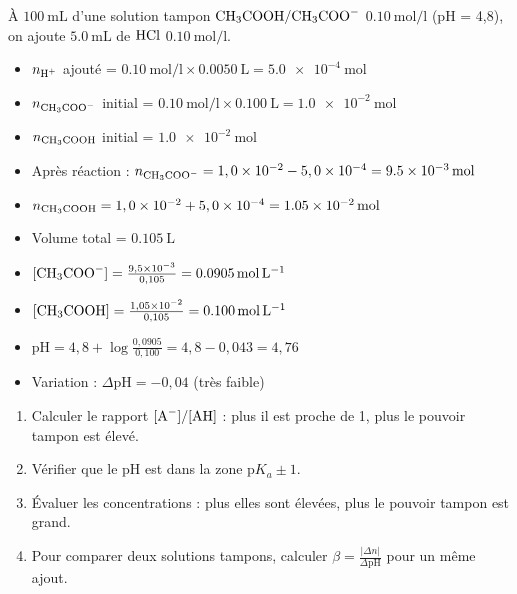 \begin{exemple}
À $\SI{100}{\mL}$ d'une solution tampon $\ce{CH3COOH/CH3COO-}$ $\SI{0,10}{\mol\per\litre}$ (pH = 4,8), on ajoute $\SI{5,0}{\mL}$ de $\ce{HCl}$ $\SI{0,10}{\mol\per\litre}$.
\begin{itemize}
    \item $n_{\ce{H+}}$ ajouté = $\SI{0,10}{\mol\per\litre} \times \SI{0,0050}{\L} = \SI{5,0e-4}{\mol}$
    \item $n_{\ce{CH3COO-}}$ initial = $\SI{0,10}{\mol\per\litre} \times \SI{0,100}{\L} = \SI{1,0e-2}{\mol}$
    \item $n_{\ce{CH3COOH}}$ initial = $\SI{1,0e-2}{\mol}$
    \item Après réaction : $n_{\ce{CH3COO-}} = 1,0\times10^{-2} - 5,0\times10^{-4} = \SI{9,5e-3}{\mol}$
    \item $n_{\ce{CH3COOH}} = 1,0\times10^{-2} + 5,0\times10^{-4} = \SI{1,05e-2}{\mol}$
    \item Volume total = $\SI{0,105}{\L}$
    \item $[\ce{CH3COO-}] = \frac{9,5\times10^{-3}}{0,105} = \SI{0,0905}{\mol\per\litre}$
    \item $[\ce{CH3COOH}] = \frac{1,05\times10^{-2}}{0,105} = \SI{0,100}{\mol\per\litre}$
    \item $\mathrm{pH} = 4,8 + \log\frac{0,0905}{0,100} = 4,8 - 0,043 = 4,76$
    \item Variation : $\Delta\mathrm{pH} = -0,04$ (très faible)
\end{itemize}
\end{exemple}

\begin{enumerate}
    \item Calculer le rapport $[\ce{A-}]/[\ce{AH}]$ : plus il est proche de 1, plus le pouvoir tampon est élevé.
    \item Vérifier que le pH est dans la zone $\mathrm{p}K_a \pm 1$.
    \item Évaluer les concentrations : plus elles sont élevées, plus le pouvoir tampon est grand.
    \item Pour comparer deux solutions tampons, calculer $\beta = \frac{|\Delta n|}{\Delta\mathrm{pH}}$ pour un même ajout.
\end{enumerate}

